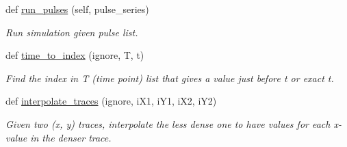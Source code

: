 \begin{DoxyCompactItemize}
def \hyperlink{classBiosystem_1_1BioSystem_a0f06478f1ed0f58adcac32451c947ec9}{run\+\_\+pulses} (self, pulse\+\_\+series)
\begin{DoxyCompactList}\small\item\em Run simulation given pulse list. \end{DoxyCompactList}\item 
def \hyperlink{classBiosystem_1_1BioSystem_abc57f3f2db47b1234e8f8d17b57a287b}{time\+\_\+to\+\_\+index} (ignore, T, t)
\begin{DoxyCompactList}\small\item\em Find the index in T (time point) list that gives a value just before t or exact t. \end{DoxyCompactList}\item 
def \hyperlink{classBiosystem_1_1BioSystem_aea1aa21f537d2371abbfa0b00b41aab4}{interpolate\+\_\+traces} (ignore, i\+X1, i\+Y1, i\+X2, i\+Y2)
\begin{DoxyCompactList}\small\item\em Given two (x, y) traces, interpolate the less dense one to have values for each x-\/value in the denser trace. \end{DoxyCompactList}\end{DoxyCompactItemize}
